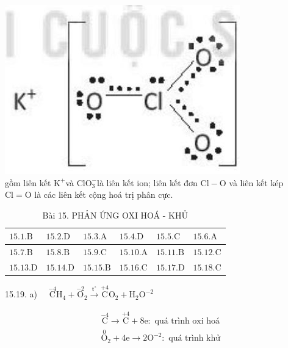 \documentclass[10pt]{article}
\begin{document}
\begin{itemize}
\includegraphics[max width=\textwidth, center]{2025_10_23_ee735750217b2aca435cg-31}\\
gồm liên kết $\mathrm{K}^{+}$và $\mathrm{ClO}_{3}^{-}$là liên kết ion; liên kết đơn $\mathrm{Cl}-\mathrm{O}$ và liên kết kép $\mathrm{Cl}=\mathrm{O}$ là các liên kết cộng hoá trị phân cực.
\end{itemize}

\begin{table}[h]
\begin{center}
\captionsetup{labelformat=empty}
\caption{Bài 15. PHẢN ỨNG OXI HOÁ - KHỦ}
\begin{tabular}{|l|l|l|l|l|l|}
\hline
$15.1 . \mathrm{B}$ & $15.2 . \mathrm{D}$ & $15.3 . \mathrm{A}$ & $15.4 . \mathrm{D}$ & $15.5 . \mathrm{C}$ & $15.6 . \mathrm{A}$ \\
\hline
$15.7 . \mathrm{B}$ & $15.8 . \mathrm{B}$ & $15.9 . \mathrm{C}$ & $15.10 . \mathrm{A}$ & $15.11 . \mathrm{B}$ & $15.12 . \mathrm{C}$ \\
\hline
$15.13 . \mathrm{D}$ & $15.14 . \mathrm{D}$ & $15.15 . \mathrm{B}$ & $15.16 . \mathrm{C}$ & $15.17 . \mathrm{D}$ & $15.18 . \mathrm{C}$ \\
\hline
\end{tabular}
\end{center}
\end{table}

15.19. a) $\quad \stackrel{-4}{\mathrm{C}} \mathrm{H}_{4}+\stackrel{-2}{\mathrm{O}}{ }_{2} \xrightarrow{\mathrm{t}^{\circ}} \stackrel{+4}{\mathrm{C}} \mathrm{O}_{2}+\mathrm{H}_{2} \mathrm{O}^{-2}$

$$
\begin{aligned}
& \stackrel{-4}{\mathrm{C}} \longrightarrow \stackrel{+4}{\mathrm{C}}+8 \mathrm{e}: \text { quá trình oxi hoá } \\
& \stackrel{0}{\mathrm{O}}_{2}+4 \mathrm{e} \longrightarrow 2 \mathrm{O}^{-2}: \text { quá trình khử }
\end{aligned}
$$
\end{document}
